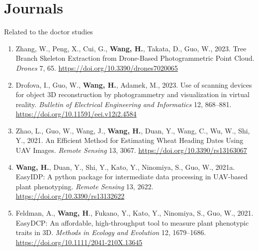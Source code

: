 \section*{Journals}

\noindent
Related to the doctor studies

\begin{enumerate}
  \item Zhang, W., Peng, X., Cui, G., \textbf{Wang, H.}, Takata, D., Guo, W., 2023. Tree Branch Skeleton Extraction from Drone-Based Photogrammetric Point Cloud. \textit{Drones} 7, 65. \url{https://doi.org/10.3390/drones7020065}
  \item Drofova, I., Guo, W., \textbf{Wang, H.}, Adamek, M., 2023. Use of scanning devices for object 3D reconstruction by photogrammetry and visualization in virtual reality. \textit{Bulletin of Electrical Engineering and Informatics} 12, 868–881. \url{https://doi.org/10.11591/eei.v12i2.4584}
  \item Zhao, L., Guo, W., Wang, J., \textbf{Wang, H.}, Duan, Y., Wang, C., Wu, W., Shi, Y., 2021. An Efficient Method for Estimating Wheat Heading Dates Using UAV Images. \textit{Remote Sensing} 13, 3067. \url{https://doi.org/10.3390/rs13163067}
  \item \textbf{Wang, H.}, Duan, Y., Shi, Y., Kato, Y., Ninomiya, S., Guo, W., 2021a. EasyIDP: A python package for intermediate data processing in UAV-based plant phenotyping. \textit{Remote Sensing} 13, 2622. \url{https://doi.org/10.3390/rs13132622}
  \item Feldman, A., \textbf{Wang, H}., Fukano, Y., Kato, Y., Ninomiya, S., Guo, W., 2021. EasyDCP: An affordable, high-throughput tool to measure plant phenotypic traits in 3D. \textit{Methods in Ecology and Evolution} 12, 1679–1686. \url{https://doi.org/10.1111/2041-210X.13645}

\end{enumerate}
